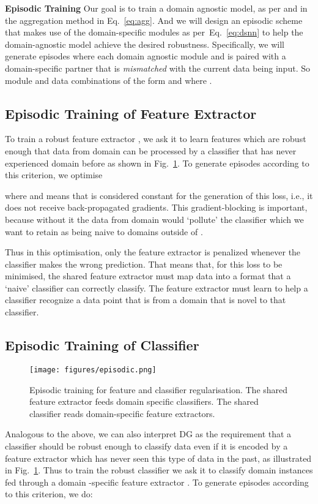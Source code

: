 \documentclass[10pt,twocolumn,letterpaper]{article}
\newcommand{\keypoint}[1]{\vspace{0.1cm}\noindent\textbf{#1}\quad}
\begin{document}
\keypoint{Episodic Training}
Our goal is to train a domain agnostic model, as per  and   in the aggregation method in Eq.~\ref{eq:agg}. And we will design an episodic scheme that makes use of the domain-specific modules as per~Eq.~\ref{eq:dsnn} to help the domain-agnostic model achieve the desired robustness. Specifically, we will generate episodes where each domain agnostic module  and  is paired with a domain-specific partner that is \emph{mismatched} with the current data being input. So module and data combinations of the form   and   where .




\subsection{Episodic Training of Feature Extractor\label{epsisodic-feat}}



To train a robust feature extractor , we ask it to learn {features which are robust enough that data from domain  can be processed by a classifier that has never experienced domain  before as shown in Fig.~\ref{fig-agg-cdt}}. To generate episodes according to this criterion, we optimise

\noindent where  and   means that  is considered constant for the generation of this loss, i.e., it does not receive back-propagated gradients. This gradient-blocking is important, because without it the data   from domain  would `pollute' the classifier  which we want to retain as being naive to domains outside of . 


Thus in this optimisation, only the feature extractor  is penalized whenever the classifier  makes the wrong prediction. That means that, for this loss to be minimised, the shared feature extractor  must map data  into a format that a `naive' classifier  can correctly classify. The feature extractor must learn to help a classifier recognize a data point that is from a domain that is novel to that classifier.



\subsection{Episodic Training of Classifier}
\begin{figure}[t]
\centering
\texttt{[image: figures/episodic.png]}
\vspace{-0.4cm}
\caption{\small Episodic training for feature and classifier regularisation. The shared feature extractor feeds domain specific classifiers. The shared classifier reads domain-specific feature extractors.}
\label{fig-agg-cdt}
    \vspace{-0.3cm}
\end{figure}
Analogous to the above, we can also interpret DG as the requirement that a classifier should be robust enough to classify data even if it is encoded by a feature extractor which has never seen this type of data in the past, as illustrated in Fig.~\ref{fig-agg-cdt}. 
Thus to train the robust classifier  we ask it to classify domain  instances  fed through a domain -specific feature extractor . To generate episodes according to this criterion, we do:
\end{document}
